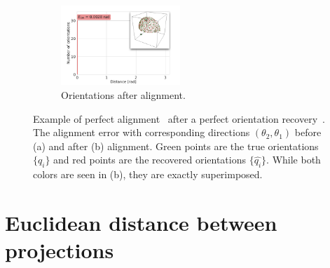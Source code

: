 \begin{figure}[ht!]
\begin{minipage}[t]{0.60\linewidth}
\begin{subfigure}[t]{0.46\linewidth}
        \end{subfigure}
        \hfill
        \begin{subfigure}[t]{0.46\linewidth}
            \centering
            \includegraphics[height=3cm]{figures/AfterAA.pdf}
            \caption{Orientations after alignment.}
        \end{subfigure}
        \caption{%
            Example of perfect alignment~ after a perfect orientation recovery~.
            The alignment error with corresponding directions $(\theta_2, \theta_1)$ before (a) and after (b) alignment.
            Green points are the true orientations $\{q_i\}$ and red points are the recovered orientations $\{\widehat{q_i}\}$.
            While both colors are seen in (b), they are exactly superimposed.
        }\label{fig:5j0n-aa-loss-perfect-distances}
    \end{minipage}
\end{figure}

\section{Euclidean distance between projections}\label{apx:results:distance-estimation}



